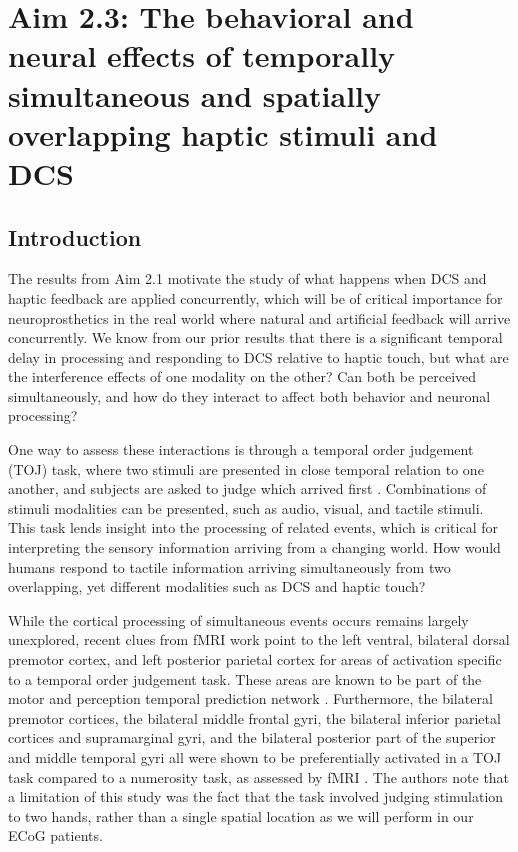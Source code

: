  
 
\chapter {Aim 2.3: The behavioral and neural effects of temporally simultaneous and spatially overlapping haptic stimuli and DCS}

\section{Introduction}

The results from Aim 2.1 motivate the study of what happens when DCS and haptic feedback are applied concurrently, which will be of critical importance for neuroprosthetics in the real world where natural and artificial feedback will arrive concurrently. We know from our prior results that there is a significant temporal delay in processing and responding to DCS relative to haptic touch, but what are the interference effects of one modality on the other? Can both be perceived simultaneously, and how do they interact to affect both behavior and neuronal processing?  

One way to assess these interactions is through a temporal order judgement (TOJ) task, where two stimuli are presented in close temporal relation to one another, and subjects are asked to judge which arrived first \cite{Miyazaki2016}. Combinations of stimuli modalities can be presented, such as audio, visual, and tactile stimuli. This task lends insight into the processing of related events, which is critical for interpreting the sensory information arriving from a changing world. How would humans respond to tactile information arriving simultaneously from two overlapping, yet different modalities such as DCS and haptic touch? 

While the cortical processing of simultaneous events occurs remains largely unexplored, recent clues from fMRI work point to the left ventral, bilateral dorsal premotor cortex, and left posterior parietal cortex for areas of activation specific to a temporal order judgement task. These areas are known to be part of the motor and perception temporal prediction network \cite{Miyazaki2016}. Furthermore, the bilateral premotor cortices, the bilateral middle frontal gyri, the bilateral inferior parietal cortices and supramarginal gyri, and the bilateral posterior part of the superior and middle temporal gyri all were shown to be preferentially activated in a TOJ task compared to a numerosity task, as assessed by fMRI \cite{Takahashi2013}. The authors note that a limitation of this study was the fact that the task involved judging stimulation to two hands, rather than a single spatial location as we will perform in our ECoG patients.

